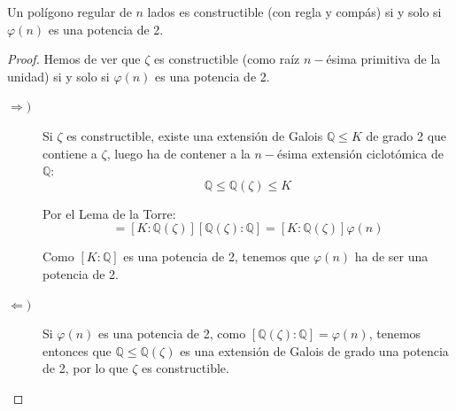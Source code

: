 \begin{coro}\label{coro:poligono_constructible}
    Un polígono regular de $n$ lados es constructible (con regla y compás) si y solo si $\varphi(n)$ es una potencia de 2.
    \begin{proof}
        Hemos de ver que $\zeta$ es constructible (como raíz $n-$ésima primitiva de la unidad) si y solo si $\varphi(n)$ es una potencia de 2.
        \begin{description}
            \item [$\Longrightarrow )$] Si $\zeta$ es constructible, existe una extensión de Galois $\mathbb{Q}\leq K$ de grado 2 que contiene a $\zeta$, luego ha de contener a la $n-$ésima extensión ciclotómica de $\mathbb{Q}$: $$\mathbb{Q}\leq \mathbb{Q}(\zeta)\leq K$$
            
            Por el Lema de la Torre:
            \begin{equation*}
                [K:\mathbb{Q}] = [K:\mathbb{Q}(\zeta)][\mathbb{Q}(\zeta):\mathbb{Q}] = [K:\mathbb{Q}(\zeta)]\varphi(n)
            \end{equation*}

            Como $[K:\mathbb{Q}]$ es una potencia de 2, tenemos que $\varphi(n)$ ha de ser una potencia de 2.
            \item [$\Longleftarrow )$] Si $\varphi(n)$ es una potencia de 2, como $[\mathbb{Q}(\zeta):\mathbb{Q}] = \varphi(n)$, tenemos entonces que $\mathbb{Q}\leq \mathbb{Q}(\zeta)$ es una extensión de Galois de grado una potencia de 2, por lo que $\zeta$ es constructible.
        \end{description}
    \end{proof}
\end{coro}


